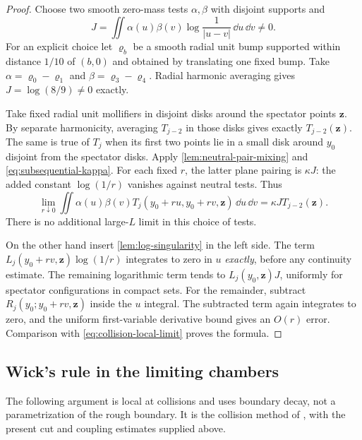 \begin{proof}
Choose two smooth zero-mass tests $\alpha,\beta$ with disjoint
supports and
\[
 J=\iint\alpha(u)\beta(v)\log\frac1{|u-v|}\,\dd u\,\dd v\ne0.
\]
For an explicit choice let $\varrho_b$ be a smooth radial unit
bump supported within distance $1/10$ of $(b,0)$ and obtained by
translating one fixed bump. Take
$\alpha=\varrho_0-\varrho_1$ and
$\beta=\varrho_3-\varrho_4$. Radial harmonic averaging gives
$J=\log(8/9)\ne0$ exactly.

Take fixed radial unit mollifiers in disjoint disks around the
spectator points $\mathbf z$. By separate harmonicity, averaging
$T_{j-2}$ in those disks gives exactly $T_{j-2}(\mathbf z)$.
The same is true of $T_j$ when its first two points lie in a
small disk around $y_0$ disjoint from the spectator disks.
Apply \cref{lem:neutral-pair-mixing} and
\eqref{eq:subsequential-kappa}. For each fixed $r$, the latter
plane pairing is $\kappa J$: the added constant $\log(1/r)$
vanishes against neutral tests. Thus
\begin{equation}
 \lim_{r\downarrow0}
 \iint\alpha(u)\beta(v)
 T_j(y_0+ru,y_0+rv,\mathbf z)\,\dd u\,\dd v
       =\kappa J T_{j-2}(\mathbf z).
 \label{eq:collision-local-limit}
\end{equation}
There is no additional large-$L$ limit in this choice of tests.

On the other hand insert \cref{lem:log-singularity} in the left
side. The term
$L_j(y_0+rv,\mathbf z)\log(1/r)$ integrates to zero in $u$
\emph{exactly}, before any continuity estimate. The remaining
logarithmic term tends to $L_j(y_0,\mathbf z)J$, uniformly for
spectator configurations in compact sets. For the remainder,
subtract $R_j(y_0;y_0+rv,\mathbf z)$ inside the $u$ integral.
The subtracted term again integrates to zero, and the uniform
first-variable derivative bound gives an $O(r)$ error.
Comparison with \eqref{eq:collision-local-limit} proves the formula.

\end{proof}

\subsection{Wick's rule in the limiting chambers}

The following argument is local at
collisions and uses boundary decay, not a parametrization of the
rough boundary. It is the collision method of
\cite[Sections~9--10]{Triangular}, with the present cut and
coupling estimates supplied above.

